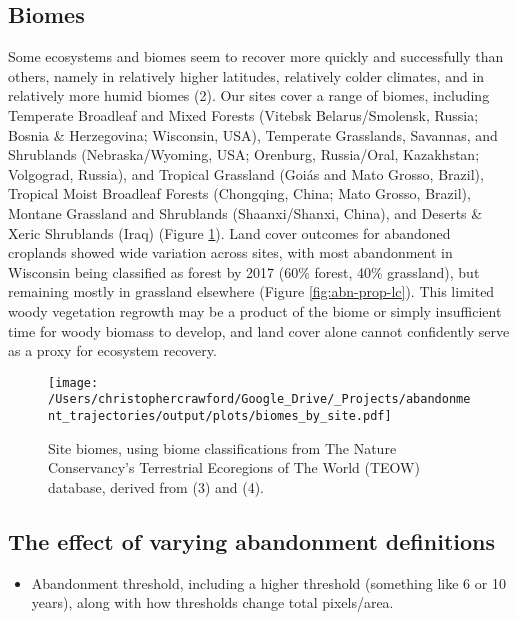 \documentclass[9pt,twoside,lineno]{pnas-new}
\providecommand{\tightlist}{%
  \setlength{\itemsep}{0pt}\setlength{\parskip}{0pt}}
\begin{document}
\hypertarget{biomes}{%
\subsection{Biomes}\label{biomes}}

Some ecosystems and biomes seem to recover more quickly and successfully than others, namely in relatively higher latitudes, relatively colder climates, and in relatively more humid biomes (2).
Our sites cover a range of biomes, including Temperate Broadleaf and Mixed Forests (Vitebsk Belarus/Smolensk, Russia; Bosnia \& Herzegovina; Wisconsin, USA), Temperate Grasslands, Savannas, and Shrublands (Nebraska/Wyoming, USA; Orenburg, Russia/Oral, Kazakhstan; Volgograd, Russia), and Tropical Grassland (Goiás and Mato Grosso, Brazil), Tropical Moist Broadleaf Forests (Chongqing, China; Mato Grosso, Brazil), Montane Grassland and Shrublands (Shaanxi/Shanxi, China), and Deserts \& Xeric Shrublands (Iraq) (Figure \ref{fig:site-biomes}).
Land cover outcomes for abandoned croplands showed wide variation across sites, with most abandonment in Wisconsin being classified as forest by 2017 (60\% forest, 40\% grassland), but remaining mostly in grassland elsewhere (Figure \ref{fig:abn-prop-lc}).
This limited woody vegetation regrowth may be a product of the biome or simply insufficient time for woody biomass to develop, and land cover alone cannot confidently serve as a proxy for ecosystem recovery.



\begin{figure}
\centering
\texttt{[image: /Users/christophercrawford/Google\_Drive/\_Projects/abandonment\_trajectories/output/plots/biomes\_by\_site.pdf]}
\caption{\label{fig:site-biomes}Site biomes, using biome classifications from The Nature Conservancy's Terrestrial Ecoregions of The World (TEOW) database, derived from (3) and (4).}
\end{figure}

\hypertarget{abn-thresholds}{%
\subsection{The effect of varying abandonment definitions}\label{abn-thresholds}}

\begin{itemize}
\tightlist
\item
  Abandonment threshold, including a higher threshold (something like 6 or 10 years), along with how thresholds change total pixels/area.
\end{itemize}
\end{document}
